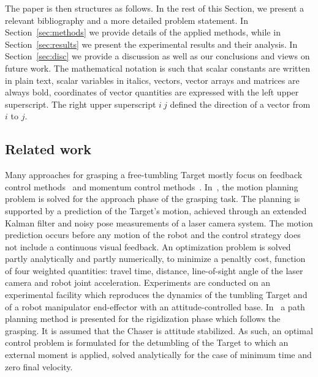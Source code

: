The paper is then structures as follows. In the rest of this Section, we present a relevant bibliography and a more detailed problem statement. In Section~\ref{sec:methods} we provide details of the applied methods, while in Section~\ref{sec:results} we present the experimental results and their analysis. In Section~\ref{sec:disc} we provide a discussion as well as our conclusions and views on future work. The mathematical notation is such that scalar constants are written in plain text, scalar variables in italics, vectors, vector arrays and matrices are always bold, coordinates of vector quantities are expressed with the left upper superscript. The right upper superscript $i\:j$ defined the direction of a vector from $i$ to $j$.
%
%
\subsection{Related work}
\label{sec:related_work}
%
Many approaches for grasping a free-tumbling Target mostly focus on feedback control methods~\cite{moosavian2007free}\cite{dlr96736} and momentum control methods~\cite{yoshida2006capture}. In~\cite{aghili2012prediction}, the motion planning problem is solved for the approach phase of the grasping task. The planning is supported by a prediction of the Target's motion, achieved through an extended Kalman filter and noisy pose measurements of a laser camera system. The motion prediction occurs before any motion of the robot and the control strategy does not include a continuous visual feedback. An optimization problem is solved partly analytically and partly numerically, to minimize a penaltly cost, function of four weighted quantities: travel time, distance, line-of-sight angle of the laser camera and robot joint acceleration. %
Experiments are conducted on an experimental facility which reproduces the dynamics of the tumbling Target and of a robot manipulator end-effector with an attitude-controlled base. In~\cite{aghili2009optimal} a path planning method is presented for the rigidization phase which follows the grasping. It is assumed that the Chaser is attitude stabilized. As such, an optimal control problem is formulated for the detumbling of the Target to which an external moment is applied, solved analytically for the case of minimum time and zero final velocity.

